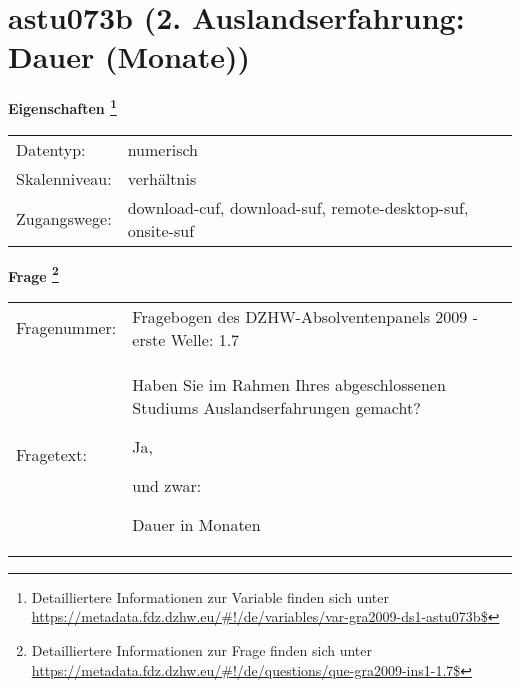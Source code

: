 
    \setcounter{footnote}{0}

    \vspace*{-1.8cm}
	\section{astu073b (2. Auslandserfahrung: Dauer (Monate))}
	\label{section:astu073b}



    \vspace*{0.5cm}
    \noindent\textbf{Eigenschaften
	\footnote{Detailliertere Informationen zur Variable finden sich unter
		\url{https://metadata.fdz.dzhw.eu/\#!/de/variables/var-gra2009-ds1-astu073b$}}}\\
	\begin{tabularx}{\hsize}{@{}lX}
	Datentyp: & numerisch \\
	Skalenniveau: & verhältnis \\
	Zugangswege: &
	  download-cuf, 
	  download-suf, 
	  remote-desktop-suf, 
	  onsite-suf
 \\
    \end{tabularx}



				\vspace*{0.5cm}
                \noindent\textbf{Frage
	                \footnote{Detailliertere Informationen zur Frage finden sich unter
		              \url{https://metadata.fdz.dzhw.eu/\#!/de/questions/que-gra2009-ins1-1.7$}}}\\
				\begin{tabularx}{\hsize}{@{}lX}
					Fragenummer: &
					  Fragebogen des DZHW-Absolventenpanels 2009 - erste Welle:
					  1.7
 \\
					Fragetext: & Haben Sie im Rahmen Ihres abgeschlossenen Studiums Auslandserfahrungen gemacht?\par  Ja,\par  und zwar:\par  Dauer in Monaten \\
				\end{tabularx}






